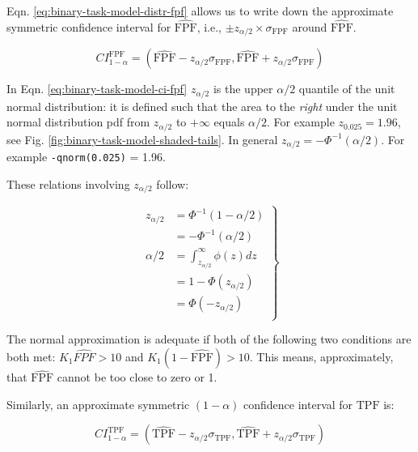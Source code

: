 \documentclass[
]{book}
\begin{document}
Eqn. \eqref{eq:binary-task-model-distr-fpf} allows us to write down the approximate symmetric confidence interval for \(\widehat{\text{FPF}}\), i.e., \(\pm z_{\alpha/2} \times \sigma_{\text{FPF}}\) around \(\widehat{\text{FPF}}\).

\begin{equation} 
CI_{1-\alpha}^{\text{FPF}}=\left ( \widehat{\text{FPF}} - z_{\alpha/2} \sigma_{\text{FPF}}, \widehat{\text{FPF}} + z_{\alpha/2} \sigma_{\text{FPF}} \right )
\label{eq:binary-task-model-ci-fpf}
\end{equation}

In Eqn. \eqref{eq:binary-task-model-ci-fpf} \(z_{\alpha/2}\) is the upper \(\alpha/2\) quantile of the unit normal distribution: it is defined such that the area to the \emph{right} under the unit normal distribution pdf from \(z_{\alpha/2}\) to \(+\infty\) equals \(\alpha/2\). For example \(z_{0.025} = 1.96\), see Fig. \ref{fig:binary-task-model-shaded-tails}. In general \(z_{\alpha/2} = -\Phi^{-1}(\alpha/2)\). For example \texttt{-qnorm(0.025)} = 1.96.

These relations involving \(z_{\alpha/2}\) follow:

\begin{equation} 
\left.
\begin{aligned} 
z_{\alpha/2} &=\Phi^{-1}\left ( 1-\alpha/2 \right )\\
&= - \Phi^{-1}\left (\alpha/2 \right )\\
\alpha/2&=\int_{z_{\alpha/2}}^{\infty}\phi(z)dz\\ 
&= 1-\Phi(z_{\alpha/2})\\
&= \Phi(-z_{\alpha/2})\\
\end{aligned}
\right \} 
\label{eq:binary-task-model-def-z-alpha2}
\end{equation}

The normal approximation is adequate if both of the following two conditions are both met: \(K_1\widehat{FPF} > 10\) and \(K_1(1-\widehat{\text{FPF}}) > 10\). This means, approximately, that \(\widehat{\text{FPF}}\) cannot be too close to zero or 1.

Similarly, an approximate symmetric \((1-\alpha)\) confidence interval for \(\text{TPF}\) is:

\begin{equation} 
CI_{1-\alpha}^{\text{TPF}}=\left ( \widehat{\text{TPF}} - z_{\alpha/2} \sigma_{\text{TPF}}, \widehat{\text{TPF}} + z_{\alpha/2} \sigma_{\text{TPF}} \right )
\label{eq:binary-task-model-ci-tpf}
\end{equation}
\end{document}
